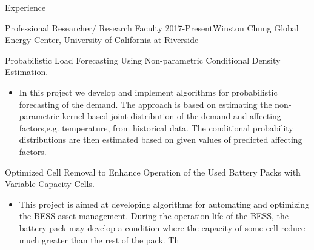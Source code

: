 \documentclass{resume} %
\begin{document}
\begin{rSection}{ Experience}
\begin{rSubsection}{Professional Researcher/  Research Faculty}{ 2017-Present}{Winston Chung Global Energy Center, University of California at Riverside}{}
\item[]  Probabilistic Load Forecasting Using Non-parametric Conditional Density Estimation.
\begin{itemize}
  \item  []  In this project we develop and implement algorithms for probabilistic forecasting of the demand.
   The approach is based on estimating the non-parametric kernel-based joint distribution of the demand and affecting factors,e.g. temperature, from historical data.
  The conditional probability distributions are then estimated based on given values of predicted affecting factors.
\end{itemize}


%

\item  [] Optimized Cell Removal to Enhance Operation of the  Used Battery Packs with Variable Capacity Cells.
\begin{itemize}
   \item  []  This project is aimed at developing algorithms for automating and optimizing the BESS asset management. 
  During the operation life of the BESS, the battery pack may develop a condition where the capacity of some cell reduce much greater than the rest of the pack. 
  Th
\end{itemize}





\end{rSubsection}
\end{rSection}
\end{document}
